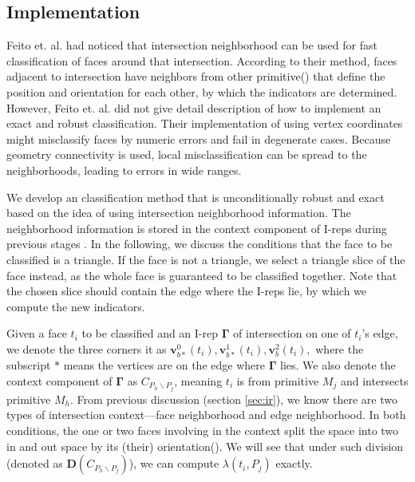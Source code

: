 \documentclass[10pt,journal,compsoc]{IEEEtran}
\begin{document}
\subsection{Implementation}

\label{sec:individual}

Feito et. al. \cite{feito2013fast} had noticed that intersection neighborhood can be used for fast classification of faces around that intersection. According to their method, faces adjacent to intersection have neighbors from other primitive() that define the position and orientation for each other, by which the indicators are determined. However, Feito et. al. did not give detail description of how to implement an exact and robust classification. Their implementation of using vertex coordinates might misclassify faces by numeric errors and fail in degenerate cases. Because geometry connectivity is used, local misclassification can be spread to the neighborhoods, leading to errors in wide ranges.

We develop an classification method that is unconditionally robust and exact based on the idea of using intersection neighborhood information. The neighborhood information is stored in the context component of I-reps during previous stages . In the following, we discuss the conditions that the face to be classified is a triangle. If the face is not a triangle, we select a triangle slice of the face instead, as the whole face is guaranteed to be classified together. Note that the chosen slice should contain the edge where the I-reps lie, by which we compute the new indicators.

Given a face $t_i$ to be classified and an I-rep $\boldsymbol\Gamma$ of intersection on one of $t_i$'s edge, we denote the three corners it as $\bm{v}_{b*}^{0}(t_i), \bm{v}_{b*}^{1}(t_i), \bm{v}_b^2(t_i),$ where the subscript $*$ means the vertices are on the edge where $\boldsymbol\Gamma$ lies. We also denote the context component of $\boldsymbol\Gamma$ as $C_{P_h \backslash P_j}$, meaning $t_i$ is from primitive $M_j$ and intersects primitive $M_h$. From previous discussion (section \ref{sec:ir}){\color{red}{may be more than one}}, we know there are two types of intersection context---face neighborhood and edge neighborhood. In both conditions, the one or two faces involving in the context split the space into two in and out space by its (their) orientation(). We will see that under such division (denoted as $\boldsymbol{D}(C_{P_h \backslash P_j})$), we can compute $\lambda(t_i, P_j)$ exactly.
\end{document}
